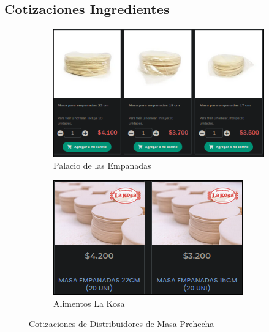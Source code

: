 \documentclass[12pt]{article}
\begin{document}
\subsection{Cotizaciones Ingredientes}
        \begin{figure}[h]
            \begin{subfigure}{0.4\textwidth}
                \centering
                \includegraphics[width=0.9\linewidth ]{palaci} %
                \caption{Palacio de las Empanadas}
                \label{fig:palacio}
            \end{subfigure}
            \begin{subfigure}{0.4\textwidth}
                \centering
                \includegraphics[width=0.9\linewidth]{kosa} %
                \caption{Alimentos La Kosa}
                \label{fig:kosa}
            \end{subfigure}
            \caption{Cotizaciones de Distribuidores de Masa Prehecha}
            \label{fig:cotizaciones_masas}


\end{figure}
\end{document}
